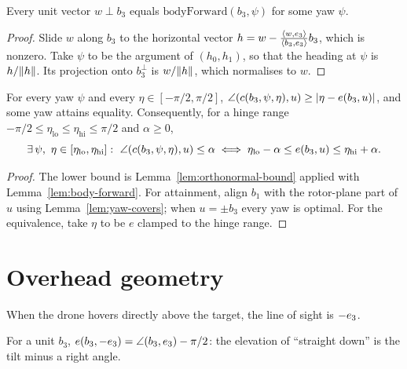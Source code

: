 \begin{lemma}
\label{lem:yaw-covers}
\leanok
{}
Every unit vector $w\perp b_3$ equals $\mathrm{bodyForward}(b_3,\psi)$ for some
yaw $\psi$.
\end{lemma}

\begin{proof}
\leanok
Slide $w$ along $b_3$ to the horizontal vector
$h=w-\frac{\langle w, e_3 \rangle}{\langle b_3, e_3 \rangle}b_3$, which is nonzero. Take $\psi$ to
be the argument of $(h_0,h_1)$, so that the heading at $\psi$ is $h/\lVert h \rVert$. Its
projection onto $b_3^\perp$ is $w/\lVert h \rVert$, which normalises to $w$.
\end{proof}

\begin{theorem}
\label{thm:pointing}
\leanok
{}
For every yaw $\psi$ and every $\eta\in[-\pi/2,\pi/2]$,
$\angle(c(b_3,\psi,\eta),u)\ge|\eta-e(b_3,u)|$, and some yaw attains equality.
Consequently, for a hinge range
$-\pi/2\le\eta_{\mathrm{lo}}\le\eta_{\mathrm{hi}}\le\pi/2$ and $\alpha\ge0$,
\[
  \exists\,\psi,\ \eta\in[\eta_{\mathrm{lo}},\eta_{\mathrm{hi}}]:\
  \ang(c(b_3,\psi,\eta),u)\le\alpha
  \iff
  \eta_{\mathrm{lo}}-\alpha\le e(b_3,u)\le\eta_{\mathrm{hi}}+\alpha .
\]
\end{theorem}

\begin{proof}
\leanok
The lower bound is Lemma~\ref{lem:orthonormal-bound} applied with
Lemma~\ref{lem:body-forward}. For attainment, align $b_1$ with the rotor-plane
part of $u$ using Lemma~\ref{lem:yaw-covers}; when $u=\pm b_3$ every yaw is
optimal. For the equivalence, take $\eta$ to be $e$ clamped to the hinge range.
\end{proof}

\section{Overhead geometry}

When the drone hovers directly above the target, the line of sight is $-e_3$.

\begin{lemma}
\label{lem:overhead-elevation}
\leanok
{}
For a unit $b_3$, $e(b_3,-e_3)=\angle(b_3,e_3)-\pi/2$: the elevation of ``straight
down'' is the tilt minus a right angle.
\end{lemma}


